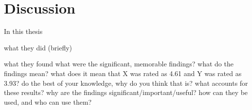 \section{Discussion}

In this thesis


what they did (briefly)

what they found
what were the significant, memorable findings?
what do the findings mean?
what does it mean that X was rated as 4.61 and Y was rated as 3.93?
do the best of your knowledge, why do you think that is? what accounts for these results?
why are the findings significant/important/useful? how can they be used, and who can use them?

\newpage